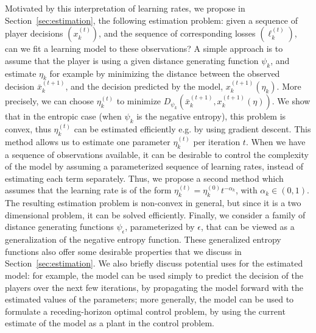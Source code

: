 \documentclass{sig-alternate-ipsn13}
\begin{document}
Motivated by this interpretation of learning rates, we propose in Section~\ref{sec:estimation}, the following estimation problem: given a sequence of player decisions $(x^{(t)}_k)$, and the sequence of corresponding losses $(\ell_k^{(t)})$, can we fit a learning model to these observations? A simple approach is to assume that the player is using a given distance generating function $\psi_k$, and estimate $\eta_k$ for example by minimizing the distance between the observed decision $\bar x^{(t+1)}_k$, and the decision predicted by the model, $x^{(t+1)}_k(\eta_k)$. More precisely, we can choose $\eta^{(t)}_k$ to minimize $D_{\psi_k}(\bar x^{(t+1)}_k, x^{(t+1)}_k(\eta))$. We show that in the entropic case (when $\psi_k$ is the negative entropy), this problem is convex, thus $\eta_k^{(t)}$ can be estimated efficiently e.g. by using gradient descent. This method allows us to estimate one parameter $\eta_k^{(t)}$ per iteration $t$. When we have a sequence of observations available, it can be desirable to control the complexity of the model by assuming a parameterized sequence of learning rates, instead of estimating each term separately. Thus, we propose a second method which assumes that the learning rate is of the form $\eta^{(t)}_k = \eta^{(0)}_k t^{-\alpha_k}$, with $\alpha_k \in (0, 1)$. The resulting estimation problem is non-convex in general, but since it is a two dimensional problem, it can be solved efficiently. Finally, we consider a family of distance generating functions $\psi_\epsilon$, parameterized by $\epsilon$, that can be viewed as a generalization of the negative entropy function. These generalized entropy functions also offer some desirable properties that we discuss in Section~\ref{sec:estimation}. We also briefly discuss potential uses for the estimated model: for example, the model can be used simply to predict the decision of the players over the next few iterations, by propagating the model forward with the estimated values of the parameters; more generally, the model can be used to formulate a receding-horizon optimal control problem, by using the current estimate of the model as a plant in the control problem.
\end{document}
